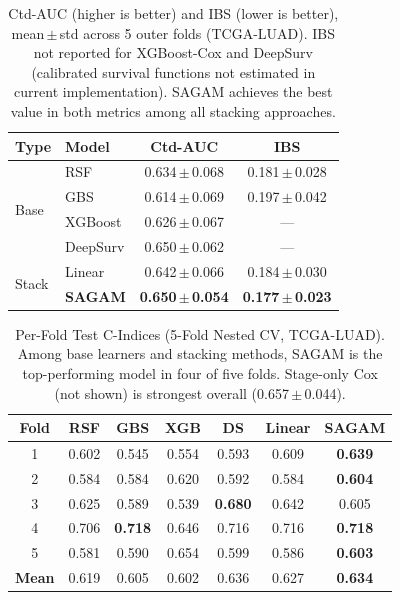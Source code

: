 \documentclass[conference]{IEEEtran}
\begin{document}
\begin{table}[t]
\caption{Ctd-AUC (higher is better) and IBS (lower is better), mean\,$\pm$\,std
across 5 outer folds (TCGA-LUAD). IBS not reported for XGBoost-Cox and
DeepSurv (calibrated survival functions not estimated in current implementation).
SAGAM achieves the best value in both metrics among all stacking approaches.}
\label{tab:ctdauc}
\begin{center}
\setlength\tabcolsep{3pt}
\begin{tabular}{llcc}
\toprule
\textbf{Type} & \textbf{Model} & \textbf{Ctd-AUC} & \textbf{IBS} \\
\midrule
\multirow{4}{*}{Base} & RSF      & 0.634\,$\pm$\,0.068 & 0.181\,$\pm$\,0.028 \\
                      & GBS      & 0.614\,$\pm$\,0.069 & 0.197\,$\pm$\,0.042 \\
                      & XGBoost  & 0.626\,$\pm$\,0.067 & --- \\
                      & DeepSurv & 0.650\,$\pm$\,0.062 & --- \\
\midrule
\multirow{2}{*}{Stack}& Linear   & 0.642\,$\pm$\,0.066 & 0.184\,$\pm$\,0.030 \\
                      & \textbf{SAGAM} & \textbf{0.650\,$\pm$\,0.054} & \textbf{0.177\,$\pm$\,0.023} \\
\bottomrule
\end{tabular}
\end{center}
\end{table}

\begin{table}[t]
\caption{Per-Fold Test C-Indices (5-Fold Nested CV, TCGA-LUAD).
Among base learners and stacking methods, SAGAM is the top-performing
model in four of five folds. Stage-only Cox (not shown) is strongest
overall (0.657\,$\pm$\,0.044).}
\label{tab:results}
\begin{center}
\setlength\tabcolsep{3pt}
\begin{tabular}{ccccccc}
\toprule
\textbf{Fold} & \textbf{RSF} & \textbf{GBS} & \textbf{XGB}
              & \textbf{DS}  & \textbf{Linear} & \textbf{SAGAM} \\
\midrule
1 & 0.602 & 0.545 & 0.554 & 0.593 & 0.609 & \textbf{0.639} \\
2 & 0.584 & 0.584 & 0.620 & 0.592 & 0.584 & \textbf{0.604} \\
3 & 0.625 & 0.589 & 0.539 & \textbf{0.680} & 0.642 & 0.605 \\
4 & 0.706 & \textbf{0.718} & 0.646 & 0.716 & 0.716 & \textbf{0.718} \\
5 & 0.581 & 0.590 & 0.654 & 0.599 & 0.586 & \textbf{0.603} \\
\midrule
\textbf{Mean} & 0.619 & 0.605 & 0.602 & 0.636 & 0.627 & \textbf{0.634} \\
\bottomrule
\end{tabular}
\end{center}
\end{table}
\end{document}
